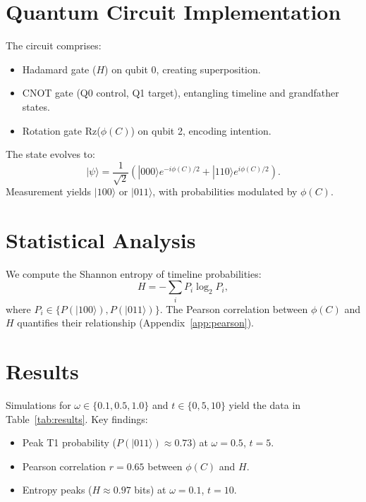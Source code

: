 \documentclass[a4paper,12pt]{article}
\begin{document}
\section{Quantum Circuit Implementation}\label{sec:circuit}
The circuit comprises:
\begin{itemize}
    \item Hadamard gate ($H$) on qubit 0, creating superposition.
    \item CNOT gate (Q0 control, Q1 target), entangling timeline and grandfather states.
    \item Rotation gate Rz($\phi(C)$) on qubit 2, encoding intention.
\end{itemize}
The state evolves to:
\[
|\psi\rangle = \frac{1}{\sqrt{2}} \left( |000\rangle e^{-i\phi(C)/2} + |110\rangle e^{i\phi(C)/2} \right).
\]
Measurement yields $|100\rangle$ or $|011\rangle$, with probabilities modulated by $\phi(C)$.

\section{Statistical Analysis}
We compute the Shannon entropy of timeline probabilities:
\[
H = - \sum_i P_i \log_2 P_i,
\]
where $P_i \in \{ P(|100\rangle), P(|011\rangle) \}$. The Pearson correlation between $\phi(C)$ and $H$ quantifies their relationship (Appendix~\ref{app:pearson}).

\section{Results}
Simulations for $\omega \in \{0.1, 0.5, 1.0\}$ and $t \in \{0, 5, 10\}$ yield the data in Table~\ref{tab:results}. Key findings:
\begin{itemize}
    \item Peak T1 probability ($P(|011\rangle) \approx 0.73$) at $\omega = 0.5$, $t = 5$.
    \item Pearson correlation $r = 0.65$ between $\phi(C)$ and $H$.
    \item Entropy peaks ($H \approx 0.97$ bits) at $\omega = 0.1$, $t = 10$.
\end{itemize}
\end{document}
